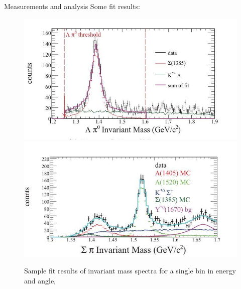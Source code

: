 \documentclass[11pt,aspectratio=1610,dvipsnames]{beamer}
\begin{document}
\begin{frame}{Measurements and analysis}
Some fit results:
\begin{figure}
	\centering
	\includegraphics[width=.49\linewidth]{inv_mass_res1}
	\includegraphics[width=.49\linewidth]{inv_mass_res2}
	\caption*{ Sample fit results of invariant mass spectra for a single bin in energy and angle,  \citet{lineshapes}}
	
\end{figure}
\end{frame}
\end{document}
